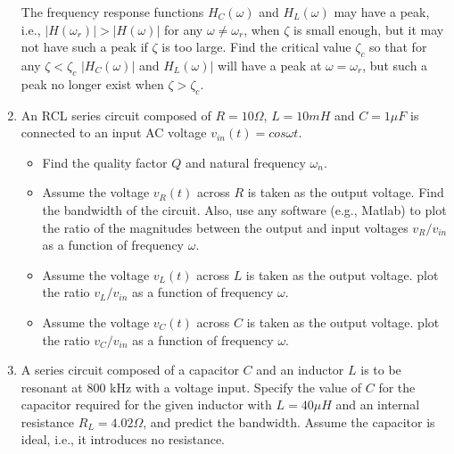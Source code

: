 \begin{enumerate}
  The frequency response functions $H_C(\omega)$ and $H_L(\omega)$
  may have a peak, i.e., $|H(\omega_r)|>|H(\omega)|$ for any $\omega\ne 
  \omega_r$, when $\zeta$ is small enough, but it may not have such a
  peak if $\zeta$ is too large. Find the critical value $\zeta_c$ so 
  that for any $\zeta<\zeta_c$ $|H_C(\omega)|$ and $H_L(\omega)|$ will 
  have a peak at $\omega=\omega_r$, but such a peak no longer exist when 
  $\zeta>\zeta_c$.  

\item An RCL series circuit composed of $R=10\Omega$, $L=10 mH$ and
  $C=1 \mu F$ is connected to an input AC voltage $v_{in}(t)=cos\omega t$.
  \begin{itemize}
  \item Find the quality factor $Q$ and natural frequency $\omega_n$.
  \item Assume the voltage $v_R(t)$ across $R$ is taken as the output voltage.
    Find the bandwidth of the circuit. Also, use any software (e.g., Matlab) 
    to plot the ratio of the magnitudes between the output and input voltages 
    $v_R/v_{in}$ as a function of frequency $\omega$.
  \item Assume the voltage $v_L(t)$ across $L$ is taken as the output voltage.
    plot the ratio $v_L/v_{in}$ as a function of frequency $\omega$.
  \item Assume the voltage $v_C(t)$ across $C$ is taken as the output voltage.
    plot the ratio $v_C/v_{in}$ as a function of frequency $\omega$.
  \end{itemize}


\item A series circuit composed of a capacitor $C$ and an inductor $L$ is to 
  be resonant at 800 kHz with a voltage input. Specify the value of $C$ for the 
  capacitor required for the given inductor with $L=40\mu H$ and an internal 
  resistance $R_L=4.02\Omega$, and predict the bandwidth. Assume the capacitor 
  is ideal, i.e., it introduces no resistance.


\end{enumerate}
